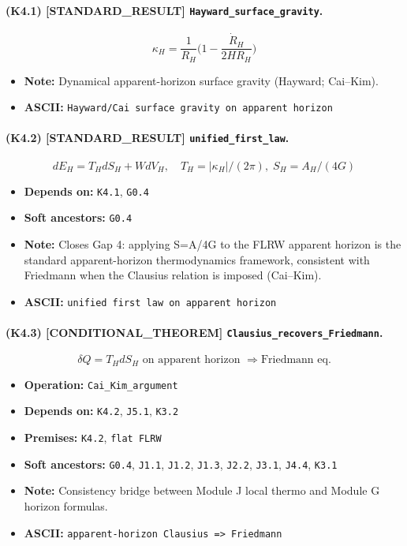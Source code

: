 \documentclass[11pt,a4paper]{article}
\theoremstyle{remark}\newtheorem*{caution}{Caution}
\newcommand{\tagbox}[1]{\textsc{[#1]}}
\begin{document}
\paragraph{(K4.1) \tagbox{STANDARD\_RESULT} \texttt{Hayward\_surface\_gravity}.}
\begin{equation}
\kappa_H=\frac{1}{R_H}\bigl(1-\frac{\dot R_H}{2HR_H}\bigr)
\tag{K4.1}
\end{equation}
\begin{itemize}\setlength{\itemsep}{0.12em}
\item \textbf{Note:} Dynamical apparent-horizon surface gravity (Hayward; Cai–Kim).
\item \textbf{ASCII:} \texttt{Hayward/Cai surface gravity on apparent horizon}
\end{itemize}
\paragraph{(K4.2) \tagbox{STANDARD\_RESULT} \texttt{unified\_first\_law}.}
\begin{equation}
dE_H=T_H dS_H+W dV_H,\quad T_H=|\kappa_H|/(2\pi),\; S_H=A_H/(4G)
\tag{K4.2}
\end{equation}
\begin{itemize}\setlength{\itemsep}{0.12em}
\item \textbf{Depends on:} \texttt{K4.1}, \texttt{G0.4}
\item \textbf{Soft ancestors:} \texttt{G0.4}
\item \textbf{Note:} Closes Gap 4: applying S=A/4G to the FLRW apparent horizon is the standard apparent-horizon thermodynamics framework, consistent with Friedmann when the Clausius relation is imposed (Cai–Kim).
\item \textbf{ASCII:} \texttt{unified first law on apparent horizon}
\end{itemize}
\paragraph{(K4.3) \tagbox{CONDITIONAL\_THEOREM} \texttt{Clausius\_recovers\_Friedmann}.}
\begin{equation}
\delta Q=T_H dS_H\text{ on apparent horizon }\Rightarrow\text{Friedmann eq.}
\tag{K4.3}
\end{equation}
\begin{itemize}\setlength{\itemsep}{0.12em}
\item \textbf{Operation:} \texttt{Cai\_Kim\_argument}
\item \textbf{Depends on:} \texttt{K4.2}, \texttt{J5.1}, \texttt{K3.2}
\item \textbf{Premises:} \texttt{K4.2}, \texttt{flat FLRW}
\item \textbf{Soft ancestors:} \texttt{G0.4}, \texttt{J1.1}, \texttt{J1.2}, \texttt{J1.3}, \texttt{J2.2}, \texttt{J3.1}, \texttt{J4.4}, \texttt{K3.1}
\item \textbf{Note:} Consistency bridge between Module J local thermo and Module G horizon formulas.
\item \textbf{ASCII:} \texttt{apparent-horizon Clausius => Friedmann}
\end{itemize}
\end{document}
